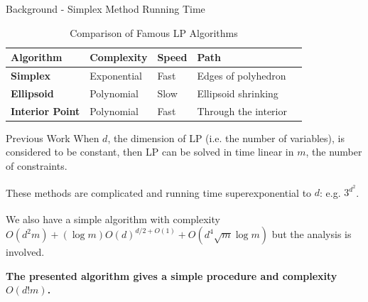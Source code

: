 \documentclass{beamer}
\newcommand{\supercite}[1]{\textsuperscript{\cite{#1}}}
\begin{document}
\begin{frame}{Background - Simplex Method Running Time}

	\begin{table}[h]
		\centering
		\begin{tabular}{|l|l|l|l|l|}
			\hline
			\textbf{Algorithm}      & \textbf{Complexity} & \textbf{Speed} & \textbf{Path}        \\ \hline
			\textbf{Simplex}        & Exponential         & Fast           & Edges of polyhedron  \\ \hline
			\textbf{Ellipsoid}      & Polynomial          & Slow           & Ellipsoid shrinking  \\ \hline
			\textbf{Interior Point} & Polynomial          & Fast           & Through the interior \\ \hline
		\end{tabular}
		\caption{Comparison of Famous LP Algorithms}
	\end{table}


\end{frame}
\begin{frame}{Previous Work}
	When $d$, the dimension of LP (i.e. the number of variables), is considered to be constant,
	then LP can be solved in time linear in $m$, the number of constraints.

	\vspace{\baselineskip}

	These methods\supercite{M2} are complicated and running time superexponential to $d$: e.g. $3^{d^2}$.

	\vspace{\baselineskip}

	We also have a simple algorithm\supercite{C2} with complexity $O(d^2m) + (\log m)O(d)^{d/2 + O(1)} + O(d^4 \sqrt{m} \log m)$
	but the analysis is involved.

	\vspace{\baselineskip}

	\textbf{The presented algorithm gives a simple procedure and complexity $O(d!m)$.}
\end{frame}
\end{document}
